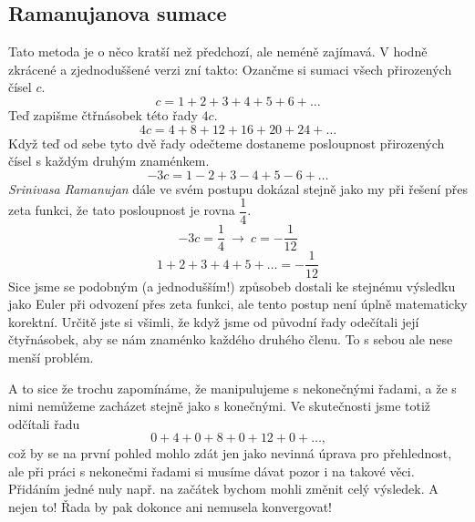 \documentclass{../../../../style/mkimain}
\begin{document}
\subsection*{Ramanujanova sumace}
Tato metoda je o něco kratší než předchozí, ale neméně zajímavá. V hodně zkrácené a zjednoduššené verzi zní takto:
Ozančme si sumaci všech přirozených čísel $c$.
$$
c=1+2+3+4+5+6+\dots
$$
Teď zapišme čtřnásobek této řady $4c$.
$$
4c=4+8+12+16+20+24+\dots
$$
Když teď od sebe tyto dvě řady odečteme dostaneme posloupnost přirozených čísel s  každým druhým znaménkem.
$$
-3c=1-2+3-4+5-6+\dots
$$
\emph{Srinivasa Ramanujan} dále ve svém postupu dokázal stejně jako my při řešení přes zeta funkci, že tato posloupnost je rovna $\dfrac{1}{4}$. 
$$
-3c=\frac{1}{4} \ \rightarrow \ c=-\frac{1}{12}
$$
$$
1+2+3+4+5+\dots=-\frac{1}{12}
$$
Sice jsme se podobným (a jednodušším!) způsobeb dostali ke stejnému výsledku jako 
Euler při odvození přes zeta funkci, ale tento postup není úplně matematicky korektní.
Určitě jste si všimli, že když jsme od původní řady odečítali její čtyřnásobek, aby se 
nám  znaménko každého druhého členu. To s sebou ale nese menší problém. 

A to sice že trochu zapomínáme, že manipulujeme s nekonečnými řadami, a že s nimi nemůžeme 
zacházet stejně jako s konečnými. Ve skutečnosti jsme totiž odčítali řadu
$$
0+4+0+8+0+12+0+\dots\text{,}
$$
což by se na první pohled mohlo zdát jen jako nevinná úprava pro přehlednost, ale při práci 
s nekonečmi řadami si musíme dávat pozor i na takové věci. Přidáním jedné nuly např. na začátek bychom mohli změnit 
celý výsledek. A nejen to! Řada by pak dokonce ani nemusela konvergovat! 


\end{document}
